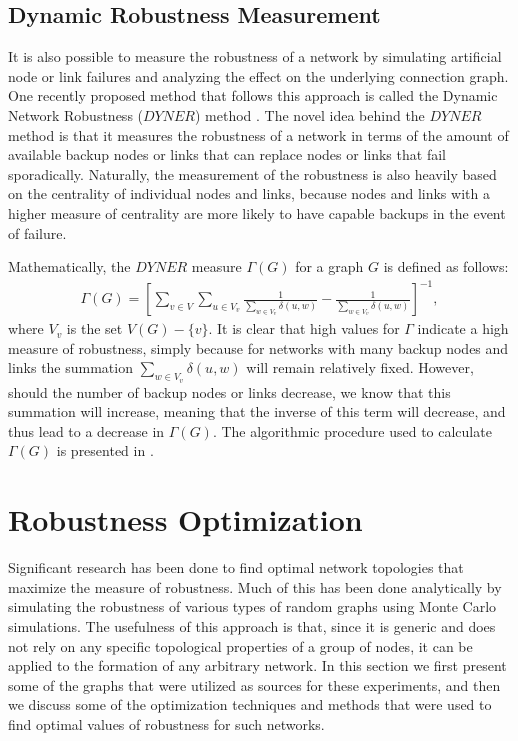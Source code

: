 \documentclass[doc]{apa}%
\begin{document}
\subsection{Dynamic Robustness Measurement}

It is also possible to measure the robustness of a network by simulating artificial node or link failures and analyzing the effect on the underlying connection graph. One recently proposed method that follows this approach is called the Dynamic Network Robustness ($DYNER$) method \cite{singerdynamic}. The novel idea behind the $DYNER$ method is that it measures the robustness of a network in terms of the amount of available backup nodes or links that can replace nodes or links that fail sporadically. Naturally, the measurement of the robustness is also heavily based on the centrality of individual nodes and links, because nodes and links with a higher measure of centrality are more likely to have capable backups in the event of failure. 

Mathematically, the $DYNER$ measure $\Gamma(G)$ for a graph $G$ is defined as follows:
\begin{eqnarray*}
\Gamma(G) = \left[\sum_{v \in V}\sum_{u \in V_v}\frac{1}{\sum_{w \in V_v}\delta(u,w)} - \frac{1}{\sum_{w \in V_v}\delta(u,w)}\right]^{-1},
\end{eqnarray*}
where $V_v$ is the set $V(G) - \{v\}$. It is clear that high values for $\Gamma$ indicate a high measure of robustness, simply because for networks with many backup nodes and links the summation $\sum_{w \in V_v}\delta(u,w)$ will remain relatively fixed. However, should the number of backup nodes or links decrease, we know that this summation will increase, meaning that the inverse of this term will decrease, and thus lead to a decrease in $\Gamma(G)$. The algorithmic procedure used to calculate $\Gamma(G)$ is presented in \cite{singerdynamic}.

\section{Robustness Optimization}
Significant research has been done to find optimal network topologies that maximize the measure of robustness. Much of this has been done analytically by simulating the robustness of various types of random graphs using Monte Carlo simulations. The usefulness of this approach is that, since it is generic and does not rely on any specific topological properties of a group of nodes, it can be applied to the formation of any arbitrary network. In this section we first present some of the graphs that were utilized as sources for these experiments, and then we discuss some of the optimization techniques and methods that were used to find optimal values of robustness for such networks.
\end{document}
